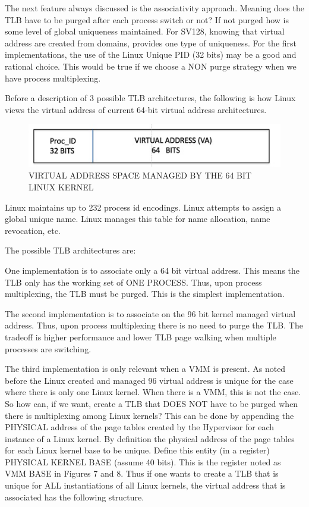 \documentclass{article}
\begin{document}
The next feature always discussed is the associativity approach.  Meaning does the TLB have to be purged after each process switch or not?   If not purged how is some level of global uniqueness maintained.  For SV128,  knowing that virtual address are created from domains, provides one type of uniqueness.    For the first implementations,   the use of the Linux Unique PID (32 bits) may be a good and rational choice.  This would be true if we choose a NON purge strategy when we have process multiplexing.

Before a description of 3 possible TLB architectures,  the following is how Linux views the virtual address of current 64-bit virtual address architectures.

\begin{figure}
\includegraphics[scale = .7]{figures/figure11_linux_kernel_address.jpg}
\caption{VIRTUAL ADDRESS SPACE MANAGED BY THE 64 BIT LINUX KERNEL}
\end{figure}



Linux maintains up to 232  process  id encodings.  Linux attempts to assign a global unique name.  Linux manages this table for name allocation,  name  revocation, etc.  

The possible TLB architectures are:

One implementation is to associate only a 64 bit virtual address.  This means the TLB only has the working set of ONE PROCESS.  Thus, upon process multiplexing,  the TLB must be purged.  This is the simplest  implementation.

The second  implementation is to associate on the 96 bit kernel managed virtual address.  Thus, upon  process multiplexing  there is no need to purge the TLB.  The tradeoff is higher performance and lower TLB page walking when multiple processes are switching.


The third implementation is only relevant when a VMM is present.  As noted before the Linux  created and managed 96 virtual address is  unique for  the case where there is only one Linux kernel.   When there is a VMM,  this is not the case.  So how can, if we want, create a TLB that DOES NOT have to be purged when there is multiplexing among Linux kernels?  This can be done by appending the PHYSICAL address of the page tables created by the Hypervisor for each instance of a Linux kernel.  By definition the physical address of the page tables for each Linux kernel base to be unique.  Define this entity (in a register) 	PHYSICAL KERNEL BASE (assume 40 bits). This is the register noted as VMM BASE in Figures 7 and 8.    Thus if one wants to create a TLB that is unique for ALL instantiations of all Linux kernels,  the virtual address that is associated has the following structure. 
\end{document}
